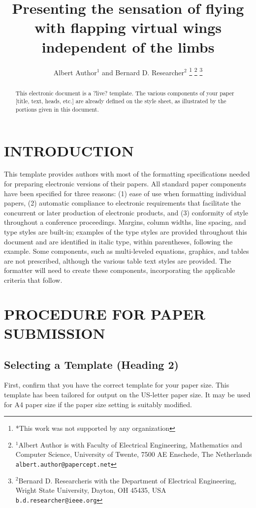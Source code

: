 \documentclass[letterpaper, 10 pt, conference]{ieeeconf}  %
\title{\LARGE \bf
Presenting the sensation of flying with flapping virtual wings independent of the limbs
}
\author{Albert Author$^{1}$ and Bernard D. Researcher$^{2}$%
\thanks{*This work was not supported by any organization}%
\thanks{$^{1}$Albert Author is with Faculty of Electrical Engineering, Mathematics and Computer Science,
        University of Twente, 7500 AE Enschede, The Netherlands
        {\tt\small albert.author@papercept.net}}%
\thanks{$^{2}$Bernard D. Researcheris with the Department of Electrical Engineering, Wright State University,
        Dayton, OH 45435, USA
        {\tt\small b.d.researcher@ieee.org}}%
}
\begin{document}
\maketitle
\thispagestyle{empty}
\pagestyle{empty}


\begin{abstract}

This electronic document is a ?live? template. The various components of your paper [title, text, heads, etc.] are already defined on the style sheet, as illustrated by the portions given in this document.

\end{abstract}


\section{INTRODUCTION}

This template provides authors with most of the formatting specifications needed for preparing electronic versions of their papers. All standard paper components have been specified for three reasons: (1) ease of use when formatting individual papers, (2) automatic compliance to electronic requirements that facilitate the concurrent or later production of electronic products, and (3) conformity of style throughout a conference proceedings. Margins, column widths, line spacing, and type styles are built-in; examples of the type styles are provided throughout this document and are identified in italic type, within parentheses, following the example. Some components, such as multi-leveled equations, graphics, and tables are not prescribed, although the various table text styles are provided. The formatter will need to create these components, incorporating the applicable criteria that follow.

\section{PROCEDURE FOR PAPER SUBMISSION}

\subsection{Selecting a Template (Heading 2)}

First, confirm that you have the correct template for your paper size. This template has been tailored for output on the US-letter paper size. 
It may be used for A4 paper size if the paper size setting is suitably modified.
\end{document}

